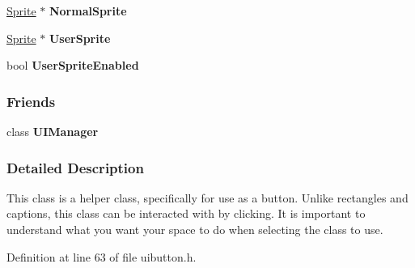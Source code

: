 \begin{DoxyCompactItemize}
\item 
\hypertarget{classMezzanine_1_1UI_1_1Button_a36975b437489593e609ef69c52e6e7cf}{
\hyperlink{structMezzanine_1_1UI_1_1Sprite}{Sprite} $\ast$ {\bfseries NormalSprite}}
\label{classMezzanine_1_1UI_1_1Button_a36975b437489593e609ef69c52e6e7cf}

\item 
\hypertarget{classMezzanine_1_1UI_1_1Button_a359fcd7bfe07e68eeaeae2eb089ccac4}{
\hyperlink{structMezzanine_1_1UI_1_1Sprite}{Sprite} $\ast$ {\bfseries UserSprite}}
\label{classMezzanine_1_1UI_1_1Button_a359fcd7bfe07e68eeaeae2eb089ccac4}

\item 
\hypertarget{classMezzanine_1_1UI_1_1Button_a91fc20d4e07c9f2204ea65db980df4ad}{
bool {\bfseries UserSpriteEnabled}}
\label{classMezzanine_1_1UI_1_1Button_a91fc20d4e07c9f2204ea65db980df4ad}

\end{DoxyCompactItemize}
\subsubsection*{Friends}
\begin{DoxyCompactItemize}
\item 
\hypertarget{classMezzanine_1_1UI_1_1Button_ab811b36cd63b54fe42b6acb231ea21bc}{
class {\bfseries UIManager}}
\label{classMezzanine_1_1UI_1_1Button_ab811b36cd63b54fe42b6acb231ea21bc}

\end{DoxyCompactItemize}


\subsubsection{Detailed Description}
This class is a helper class, specifically for use as a button. Unlike rectangles and captions, this class can be interacted with by clicking. It is important to understand what you want your space to do when selecting the class to use. 

Definition at line 63 of file uibutton.h.



